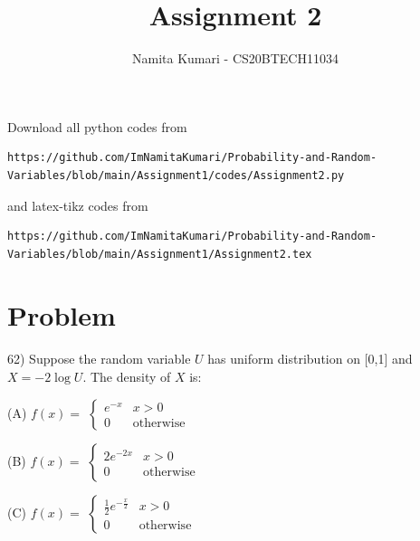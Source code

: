\documentclass[journal,12pt,twocolumn]{IEEEtran}
\begin{document}
\makeatletter
{}
\makeatother
\let\StandardTheFigure\thefigure
\let\vec\mathbf
\renewcommand{\thefigure}{\theproblem}
\def\putbox#1#2#3{\makebox[0in][l]{\makebox[#1][l]{}\raisebox{\baselineskip}[0in][0in]{\raisebox{#2}[0in][0in]{#3}}}}
     \def\rightbox#1{\makebox[0in][r]{#1}}
     \def\centbox#1{\makebox[0in]{#1}}
     \def\topbox#1{\raisebox{-\baselineskip}[0in][0in]{#1}}
     \def\midbox#1{\raisebox{-0.5\baselineskip}[0in][0in]{#1}}
\vspace{3cm}
\title{Assignment 2}
\author{Namita Kumari - CS20BTECH11034}
\maketitle
\newpage
\bigskip
Download all python codes from 
\begin{lstlisting}
https://github.com/ImNamitaKumari/Probability-and-Random-Variables/blob/main/Assignment1/codes/Assignment2.py
\end{lstlisting}
%
and latex-tikz codes from 
%
\begin{lstlisting}
https://github.com/ImNamitaKumari/Probability-and-Random-Variables/blob/main/Assignment1/Assignment2.tex
\end{lstlisting}
\section{Problem}
62) Suppose the random variable $U$ has uniform distribution on [0,1] and $X=-2\log{U}$. The density of $X$ is:

(A) $f(x)=$
$\begin{cases}
e^{-x} & x>0\\
0 & \mathrm{otherwise}
\end{cases}$

(B) $f(x)=$
$\begin{cases}
2e^{-2x} & x>0\\
0 & \mathrm{otherwise}
\end{cases}$

(C) $f(x)=$
$\begin{cases}
\frac{1}{2}e^{-\frac{x}{2}} & x>0\\
0 & \mathrm{otherwise}
\end{cases}$
\end{document}
